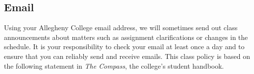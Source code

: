 %


\vspace*{-.2in}
\subsection*{Email}

Using your Allegheny College email address, we will sometimes send out class announcements about matters such as
assignment clarifications or changes in the schedule. It is your responsibility to check your email at least once a day
and to ensure that you can reliably send and receive emails. This class policy is based on the following statement in
{\em The Compass}, the college's student handbook.

